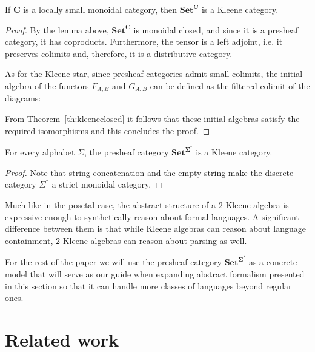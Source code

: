 \documentclass[sigconf,anonymous,review,screen]{acmart}
\newcommand{\cat}[1]{\mathbf{#1}}
\newcommand{\Set}{\mathbf{Set}}
\begin{document}
\begin{theorem}
  If $\cat{C}$ is a locally small monoidal category, then
  $\Set^{\cat{C}}$ is a Kleene category.
\end{theorem}
\begin{proof}

  By the lemma above, $\Set^{\cat{C}}$ is monoidal closed, and since it
  is a presheaf category, it has coproducts. Furthermore, the tensor
  is a left adjoint, i.e. it preserves colimits and, therefore, it is
  a distributive category.

  As for the Kleene star, since presheaf categories admit small colimits,
  the initial algebra of the functors $F_{A,B}$ and $G_{A,B}$ can be
  defined as the filtered colimit of the diagrams:

  From Theorem~\ref{th:kleeneclosed} it follows that these initial
  algebras satisfy the required isomorphisms and this concludes the
  proof.
\end{proof}

\begin{corollary}
  For every alphabet $\Sigma$, the presheaf category $\Set^{\cat{\Sigma^*}}$
  is a Kleene category.
\end{corollary}
\begin{proof}
  Note that string concatenation and the empty string make the
  discrete category $\Sigma^*$ a strict monoidal category.
\end{proof}

Much like in the posetal case, the abstract structure of a 2-Kleene
algebra is expressive enough to synthetically reason about formal
languages. A significant difference between them is that while Kleene
algebras can reason about language containment, 2-Kleene algebras can
reason about parsing as well.

For the rest of the paper we will use the presheaf category
$\Set^{\cat{\Sigma^*}}$ as a concrete model that will serve as our
guide when expanding abstract formalism presented in this section so
that it can handle more classes of languages beyond regular ones.

\section{Related work}
\end{document}
